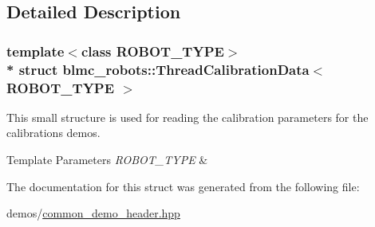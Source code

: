 \subsection{Detailed Description}
\subsubsection*{template$<$class R\+O\+B\+O\+T\+\_\+\+T\+Y\+PE$>$\\*
struct blmc\+\_\+robots\+::\+Thread\+Calibration\+Data$<$ R\+O\+B\+O\+T\+\_\+\+T\+Y\+P\+E $>$}

This small structure is used for reading the calibration parameters for the calibrations demos. 


\begin{DoxyTemplParams}{Template Parameters}
{\em R\+O\+B\+O\+T\+\_\+\+T\+Y\+PE} & \\
\hline
\end{DoxyTemplParams}


The documentation for this struct was generated from the following file\+:\begin{DoxyCompactItemize}
\item 
demos/\hyperlink{common__demo__header_8hpp}{common\+\_\+demo\+\_\+header.\+hpp}\end{DoxyCompactItemize}
